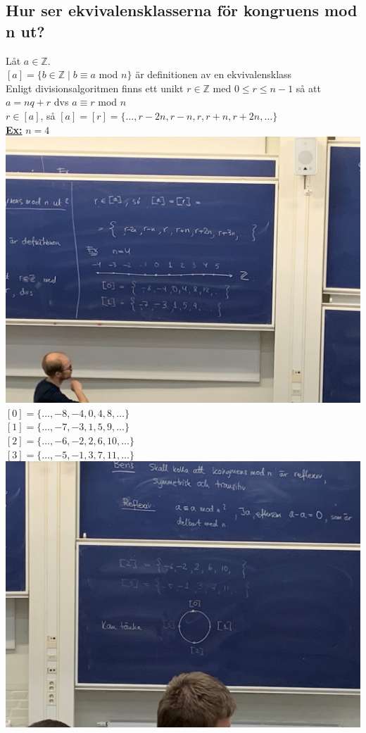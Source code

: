 \documentclass{article}
\begin{document}
    \subsection{Hur ser ekvivalensklasserna för kongruens mod n ut?}
    Låt $a\in \mathbb{Z}$.\\
    \indent $[a]=\{b\in\mathbb{Z}\mid b\equiv a$ mod $n\}$ är definitionen av en ekvivalensklass\\
    Enligt divisionsalgoritmen finns ett unikt $r\in \mathbb{Z}$ med $0\leq r\leq n-1$ så att $a=nq+r$ dvs $a\equiv r$ mod $n$\\
    $r\in [a]$, så $[a]=[r]=\{\ldots , r-2n, r-n, r, r+n, r+2n, \ldots\}$\\
    \underline{\textbf{Ex:}} $n=4$\\
    \includegraphics[scale=0.05]{imgs/lesson-21-12-07/img01-21-12-07.png}\\
    $[0]=\{\ldots, -8, -4, 0, 4, 8, \ldots\}$\\
    $[1]=\{\ldots, -7, -3, 1, 5, 9, \ldots\}$\\
    $[2]=\{\ldots, -6, -2, 2, 6, 10, \ldots\}$\\
    $[3]=\{\ldots, -5, -1, 3, 7, 11, \ldots\}$\\
    \includegraphics[scale=0.05]{imgs/lesson-21-12-07/img02-21-12-07.png}\\
\end{document}
